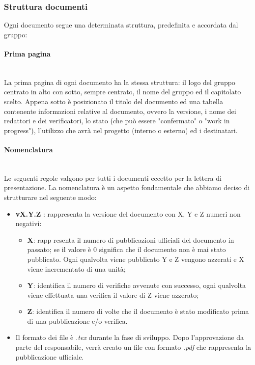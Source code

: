 \subsubsection{Struttura documenti}\label{ProcessiSupporto_Documentazione_StrutturaDocumenti}
Ogni documento segue una determinata struttura, predefinita e accordata dal gruppo:

\paragraph{Prima pagina} \-\\
La prima pagina di ogni documento ha la stessa struttura: il logo del gruppo centrato in alto con sotto, sempre centrato, il nome del gruppo ed il capitolato scelto. Appena sotto è posizionato il titolo del documento ed una tabella contenente informazioni relative al documento, ovvero la versione, i nome dei redattori e dei verificatori, lo stato (che può essere "confermato" o "work in progress"), l'utilizzo che avrà nel progetto (interno o esterno) ed i destinatari.

\paragraph{Nomenclatura} \-\\
Le seguenti regole valgono per tutti i documenti eccetto per la lettera di presentazione. La nomenclatura è un aspetto fondamentale che abbiamo deciso di strutturare nel seguente modo: 
\begin{itemize}
	\item \textbf{vX.Y.Z }: rappresenta la versione del documento con X, Y e Z numeri non negativi:
	\begin{itemize}
		\item \textbf{X}: rapp resenta il numero di pubblicazioni ufficiali del documento in passato; se il valore è 0 significa che il documento non è mai stato pubblicato. Ogni qualvolta viene pubblicato Y e Z vengono azzerati e X viene incrementato di una unità;
		\item \textbf{Y}: identifica il numero di verifiche avvenute con successo, ogni qualvolta viene effettuata una verifica il valore di Z viene azzerato;
		\item \textbf{Z}: identifica il numero di volte che il documento è stato modificato prima di una pubblicazione e/o verifica.
	\end{itemize}
	\item Il formato dei file è \textit{.tex} durante la fase di sviluppo. Dopo l'approvazione da parte del responsabile, verrà creato un file con formato \textit{.pdf} che rappresenta la pubblicazione ufficiale.
\end{itemize}

